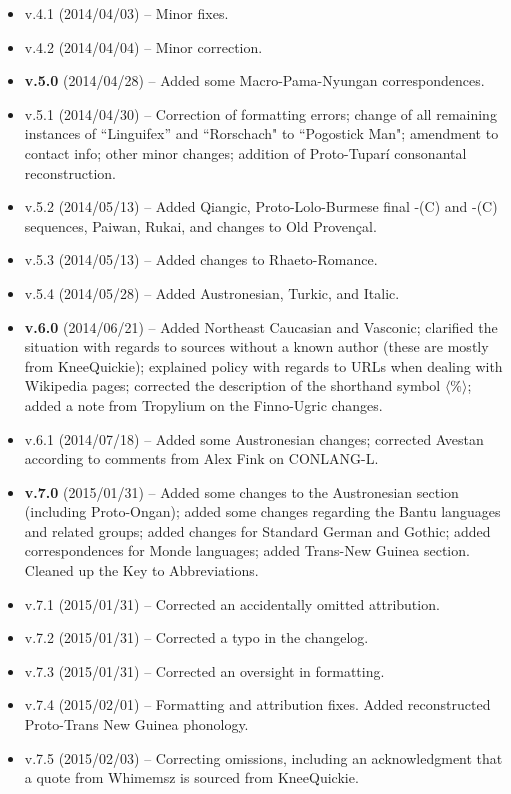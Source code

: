 \begin{itemize}
\item v.4.1 (2014/04/03) -- Minor fixes.
\item v.4.2 (2014/04/04) -- Minor correction.
\item \textbf{v.5.0} (2014/04/28) -- Added some Macro-Pama-Nyungan correspondences.
\item v.5.1 (2014/04/30) -- Correction of formatting errors; change of all remaining instances of ``Linguifex'' and ``Rorschach" to ``Pogostick Man"; amendment to contact info; other minor changes; addition of Proto-Tupar\'{i} consonantal reconstruction.
\item v.5.2 (2014/05/13) -- Added Qiangic, Proto-Lolo-Burmese final -(C) and -(C) sequences, Paiwan, Rukai, and changes to Old Proven\c{c}al.
\item v.5.3 (2014/05/13) -- Added changes to Rhaeto-Romance.
\item v.5.4 (2014/05/28) -- Added Austronesian, Turkic, and Italic.
\item {\bf v.6.0} (2014/06/21) -- Added Northeast Caucasian and Vasconic; clarified the situation with regards to sources without a known author (these are mostly from KneeQuickie); explained policy with regards to URLs when dealing with Wikipedia pages; corrected the description of the shorthand symbol $\langle$\%$\rangle$; added a note from Tropylium on the Finno-Ugric changes.
\item v.6.1 (2014/07/18) -- Added some Austronesian changes; corrected Avestan according to comments from Alex Fink on CONLANG-L.
\item \textbf{v.7.0} (2015/01/31) -- Added some changes to the Austronesian section (including Proto-Ongan); added some changes regarding the Bantu languages and related groups; added changes for Standard German and Gothic; added correspondences for Monde languages; added Trans-New Guinea section. Cleaned up the Key to Abbreviations.
\item v.7.1 (2015/01/31) -- Corrected an accidentally omitted attribution.
\item v.7.2 (2015/01/31) -- Corrected a typo in the changelog.
\item v.7.3 (2015/01/31) -- Corrected an oversight in formatting.
\item v.7.4 (2015/02/01) -- Formatting and attribution fixes. Added reconstructed Proto-Trans New Guinea phonology.
\item v.7.5 (2015/02/03) -- Correcting omissions, including an acknowledgment that a quote from Whimemsz is sourced from KneeQuickie.

\end{itemize}
